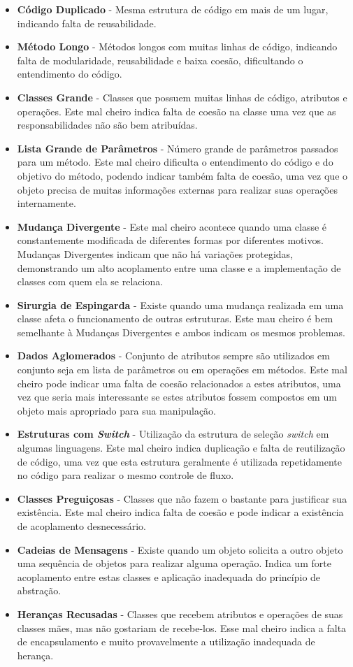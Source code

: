 \begin{itemize}
\item \textbf{Código Duplicado} - Mesma estrutura de código em mais de um lugar, indicando falta de reusabilidade.
\item \textbf{Método Longo} - Métodos longos com muitas linhas de código, indicando falta de modularidade, reusabilidade e baixa coesão, dificultando o entendimento do código.
\item \textbf{Classes Grande} - Classes que possuem muitas linhas de código, atributos e operações. Este mal cheiro indica falta de coesão na classe uma vez que as responsabilidades não são bem atribuídas.
\item \textbf{Lista Grande de Parâmetros} - Número grande de parâmetros passados para um método. Este mal cheiro dificulta o entendimento do código e do objetivo do método, podendo indicar também falta de coesão, uma vez que o objeto precisa de muitas informações externas para realizar suas operações internamente.
\item \textbf{Mudança Divergente} - Este mal cheiro acontece quando uma classe é constantemente modificada de diferentes formas por diferentes motivos. Mudanças Divergentes indicam que não há variações protegidas, demonstrando um alto acoplamento entre uma classe e a implementação de classes com quem ela se relaciona.
\item \textbf{Sirurgia de Espingarda} - Existe quando uma mudança realizada em uma classe afeta o funcionamento de outras estruturas. Este mau cheiro é bem semelhante à Mudanças Divergentes e ambos indicam os mesmos problemas.
\item \textbf{Dados Aglomerados} - Conjunto de atributos sempre são utilizados em conjunto seja em lista de parâmetros ou em operações em métodos. Este mal cheiro pode indicar uma falta de coesão relacionados a estes atributos, uma vez que seria mais interessante se estes atributos fossem compostos em um objeto mais apropriado para sua manipulação.
\item \textbf{Estruturas com \emph{Switch}} - Utilização da estrutura de seleção \emph{switch} em algumas linguagens. Este mal cheiro indica duplicação e falta de reutilização de código, uma vez que esta estrutura geralmente é utilizada repetidamente no código para realizar o mesmo controle de fluxo.
\item \textbf{Classes Preguiçosas} - Classes que não fazem o bastante para justificar sua existência. Este mal cheiro indica falta de coesão e pode indicar a existência de acoplamento desnecessário.
\item \textbf{Cadeias de Mensagens} - Existe quando um objeto solicita a outro objeto uma sequência de objetos para realizar alguma operação. Indica um forte acoplamento entre estas classes e aplicação inadequada do princípio de abstração.
\item \textbf{Heranças Recusadas} - Classes que recebem atributos e operações de suas classes mães, mas não gostariam de recebe-los. Esse mal cheiro indica a falta de encapsulamento e muito provavelmente a utilização inadequada de herança.
\end{itemize}

